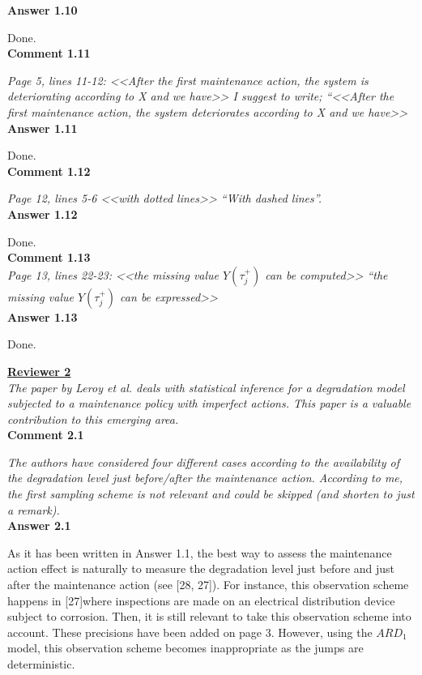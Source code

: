 { \bf Answer 1.10}

Done.\\

{ \bf Comment 1.11}

{\it Page 5, lines 11-12: <<After the first maintenance action, the system is deteriorating according to X and we have>> I suggest to write; “<<After the first maintenance action, the system deteriorates according to X and we have>>}\\
 
{ \bf Answer 1.11}

Done.\\

{ \bf Comment 1.12 }

{\it Page 12, lines 5-6 <<with dotted lines>> “With dashed lines”.}\\

{ \bf Answer 1.12}

Done.\\

{ \bf Comment 1.13 }\\

{\it Page 13, lines 22-23: <<the missing value $Y(\tau_j^+)$ can be computed>> “the missing value $Y(\tau_j^+)$ can be expressed>>}\\

{ \bf Answer 1.13}

Done.\\

\vspace{1cm}

{\bf \large \underline{Reviewer 2}}\\

{\it The paper by Leroy et al. deals with statistical inference for a degradation model subjected to a maintenance policy with imperfect actions. This paper is a valuable contribution to this emerging area.} \\

{ \bf Comment 2.1}

{\it The authors have considered four different cases according to the availability of the degradation level just before/after the maintenance action. According to me, the first sampling scheme is not relevant and could be skipped (and shorten to just a remark).} \\

{ \bf Answer 2.1 }

As it has been written in Answer 1.1, the best way to assess the maintenance action effect is naturally to  measure the degradation level just before and just after the maintenance action (see [28, 27]). For instance, this observation scheme happens in [27]where inspections are made on an electrical distribution device subject to corrosion. Then, it is still relevant to take this observation scheme into account. These precisions have been added on page 3. However, using the $ARD_1$ model, this observation scheme becomes inappropriate as the jumps are deterministic.\\


